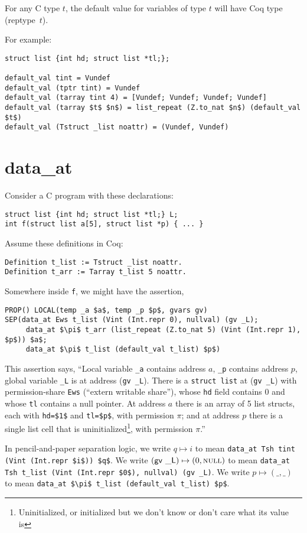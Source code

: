 \documentclass[12pt,fleqn,openany,oneside,showtrims]{memoir}
\begin{document}
For any C type $t$, the default value for variables of type $t$
will have Coq type (reptype~$t$).

For example:

\begin{lstlisting}
struct list {int hd; struct list *tl;};

default_val tint = Vundef
default_val (tptr tint) = Vundef
default_val (tarray tint 4) = [Vundef; Vundef; Vundef; Vundef]
default_val (tarray $t$ $n$) = list_repeat (Z.to_nat $n$) (default_val $t$)
default_val (Tstruct _list noattr) = (Vundef, Vundef)
\end{lstlisting}

\chapter{\upshape data\_at}
\label{refcard:data-at}
Consider a C program with these declarations:
\begin{lstlisting}
struct list {int hd; struct list *tl;} L;
int f(struct list a[5], struct list *p) { ... }
\end{lstlisting}
Assume these definitions in Coq:
\begin{lstlisting}
Definition t_list := Tstruct _list noattr.
Definition t_arr := Tarray t_list 5 noattr.
\end{lstlisting}

Somewhere inside \lstinline{f}, we might have the
assertion,
\begin{lstlisting}
PROP() LOCAL(temp _a $a$, temp _p $p$, gvars gv)
SEP(data_at Ews t_list (Vint (Int.repr 0), nullval) (gv _L);
     data_at $\pi$ t_arr (list_repeat (Z.to_nat 5) (Vint (Int.repr 1), $p$)) $a$;
     data_at $\pi$ t_list (default_val t_list) $p$)
\end{lstlisting}
This assertion says, ``Local variable \lstinline{_a} contains
address $a$, \lstinline{_p} contains address $p$, global variable
\lstinline{_L} is at address (\lstinline{gv _L}).
There is a \lstinline{struct list} at (\lstinline{gv _L})
with permission-share \lstinline{Ews} (``extern writable share''),
whose \lstinline{hd} field contains 0 and whose
\lstinline{tl} contains a null pointer.
At address $a$ there is an array of 5 list structs,
each with \lstinline{hd=$1$} and \lstinline{tl=$p$},
with permission $\pi$; and at address
$p$ there is a single list cell that is
uninitialized\footnote{Uninitialized, or initialized but
  we don't know or don't care what its value is},
with permission $\pi$.''

In pencil-and-paper separation logic, we write
$q \mapsto i$ to mean\newline
\lstinline{data_at Tsh tint (Vint (Int.repr $i$)) $q$}.
We write $(\mathsf{gv \ \_L}) \mapsto (0,\mbox{\textsc{null}})$ to mean
\lstinline{data_at Tsh t_list (Vint (Int.repr $0$), nullval) (gv _L)}.
We write $p \mapsto (\_,\_)$ to mean
\lstinline{data_at $\pi$ t_list (default_val t_list) $p$}.
\end{document}
